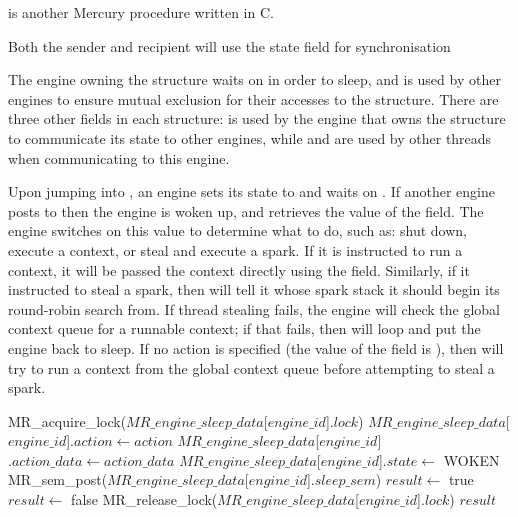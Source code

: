 
\sleep is another Mercury procedure written in C.

Both the sender and recipient will use the state field for synchronisation  


The engine owning the structure waits on  in order to
sleep,
and  is used by other engines to ensure mutual exclusion for
their accesses to the \enginesleepsync structure.
There are three other fields in each structure:
 is used by the engine that owns the structure to communicate
its state to other engines,
while  and  are used by other threads when
communicating to this engine.

Upon jumping into \idle,
an engine sets its state to  and waits on .
If another engine posts to  then the engine is woken up,
and retrieves the value of the  field.
The engine switches on this value to determine what to do,
such as:
shut down, 
execute a context, or
steal and execute a spark.
If it is instructed to run a context,
it will be passed the context directly
using the  field.
Similarly, if it instructed to steal a spark,
then  will tell
it whose spark stack it should begin its round-robin search from.
If thread stealing fails,
the engine will check the global context queue for
a runnable context;
if that fails,
then \idle will loop and put the engine back to sleep.
If no action is specified
(the value of the  field is ),
then \sleep will try to run a context from the global context queue before
attempting to steal a spark.

\begin{algorithm}[tbp]
\begin{algorithmic}
    \State MR\_acquire\_lock($MR\_engine\_sleep\_data$[$engine\_id$]$.lock$)
        \State $MR\_engine\_sleep\_data$[$engine\_id$]$.action \gets action$
        \State $MR\_engine\_sleep\_data$[$engine\_id$]$.action\_data \gets action\_data$
        \State $MR\_engine\_sleep\_data$[$engine\_id$]$.state \gets$ WOKEN
        \State MR\_sem\_post($MR\_engine\_sleep\_data$[$engine\_id$]$.sleep\_sem$)
        \State $result \gets$ true
    \Else
        \State $result \gets$ false
    \EndIf
    \State MR\_release\_lock($MR\_engine\_sleep\_data$[$engine\_id$]$.lock$)
    \State \Return $result$
\EndProcedure
\end{algorithmic}
\caption{\wakeengine}
\label{alg:wake_engine}
\end{algorithm}

